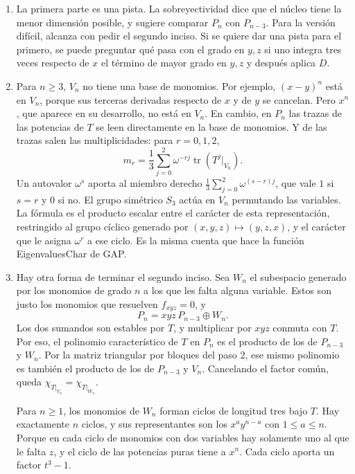 \documentclass[11pt]{amsproc}
\newcommand{\tr}{\operatorname{tr}}
\begin{document}
\begin{enumerate}
  \item La primera parte es una pista. La sobreyectividad dice que el núcleo
    tiene la menor dimensión posible, y sugiere comparar $P_n$ con $P_{n-3}$.
    Para la versión difícil, alcanza con pedir el segundo inciso. Si se
    quiere dar una pista para el primero, se puede preguntar qué pasa con el
    grado en $y,z$ si uno integra tres veces respecto de $x$ el término de
    mayor grado en $y,z$ y después aplica $D$.

  \item Para $n\ge 3$, $V_n$ no tiene una base de monomios. Por ejemplo,
    $(x-y)^n$ está en $V_n$, porque sus terceras derivadas respecto de $x$ y
    de $y$ se cancelan. Pero $x^n$, que aparece en su desarrollo, no está en
    $V_n$. En cambio, en $P_n$ las trazas de las potencias de $T$ se leen
    directamente en la base de monomios. Y de las trazas salen las
    multiplicidades: para $r=0,1,2$,
    \[
      m_r=\frac{1}{3}\sum_{j=0}^2\omega^{-rj}\tr(T^j|_{V_n}).
    \]
    Un autovalor $\omega^s$ aporta al miembro derecho
    $\tfrac13\sum_{j=0}^2\omega^{(s-r)j}$, que vale $1$ si $s=r$ y $0$ si
    no. El grupo simétrico $S_3$ actúa en $V_n$ permutando las variables. La
    fórmula es el producto escalar entre el carácter de esta representación,
    restringido al grupo cíclico generado por $(x,y,z)\mapsto(y,z,x)$, y el
    carácter que le asigna $\omega^r$ a ese ciclo. Es la misma cuenta que
    hace la función \textsf{EigenvaluesChar} de \textsf{GAP}.

  \item Hay otra forma de terminar el segundo inciso. Sea $W_n$ el subespacio
    generado por los monomios de grado $n$ a los que les falta alguna
    variable. Estos son justo los monomios que resuelven $f_{xyz}=0$, y
    \[
      P_n=xyz\,P_{n-3}\oplus W_n .
    \]
    Los dos sumandos son estables por $T$, y multiplicar por $xyz$ conmuta
    con $T$. Por eso, el polinomio característico de $T$ en $P_n$ es el
    producto de los de $P_{n-3}$ y $W_n$. Por la matriz triangular por
    bloques del paso 2, ese mismo polinomio es también el producto de los de
    $P_{n-3}$ y $V_n$. Cancelando el factor común, queda
    $\chi_{T|_{V_n}}=\chi_{T|_{W_n}}$.

    Para $n\ge 1$, los monomios de $W_n$ forman ciclos de longitud tres bajo
    $T$. Hay exactamente $n$ ciclos, y sus representantes son los
    $x^ay^{n-a}$ con $1\le a\le n$. Porque en cada ciclo de monomios con dos
    variables hay solamente uno al que le falta $z$, y el ciclo de las
    potencias puras tiene a $x^n$. Cada ciclo aporta un factor $t^3-1$.


\end{enumerate}
\end{document}
